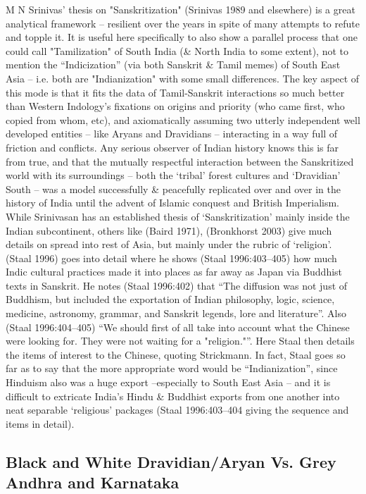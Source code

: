 M N Srinivas’ thesis on "Sanskritization" (Srinivas 1989 and elsewhere) is a great analytical framework – resilient over the years in spite of many attempts to refute and topple it. It is useful here specifically to also show a parallel process that one could call "Tamilization" of South India (\& North India to some extent), not to mention the “Indicization” (via both Sanskrit \& Tamil memes) of South East Asia -- i.e. both are "Indianization" with some small differences. The key aspect of this mode is that it fits the data of Tamil-Sanskrit interactions so much better than Western Indology’s fixations on origins and priority (who came first, who copied from whom, etc), and axiomatically assuming two utterly independent well developed entities – like Aryans and Dravidians – interacting in a way full of friction and conflicts. Any serious observer of Indian history knows this is far from true, and that the mutually respectful interaction between the Sanskritized world with its surroundings – both the ‘tribal’ forest cultures and ‘Dravidian’ South – was a model successfully \& peacefully replicated over and over in the history of India until the advent of Islamic conquest and British Imperialism. While Srinivasan has an established thesis of ‘Sanskritization’ mainly inside the Indian subcontinent, others like (Baird 1971), (Bronkhorst 2003) give much details on spread into rest of Asia, but mainly under the rubric of ‘religion’. (Staal 1996) goes into detail where he shows (Staal 1996:403–405) how much Indic cultural practices made it into places as far away as Japan via Buddhist texts in Sanskrit. He notes (Staal 1996:402) that “The diffusion was not just of Buddhism, but included the exportation of Indian philosophy, logic, science, medicine, astronomy, grammar, and Sanskrit legends, lore and literature”. Also (Staal 1996:404–405) “We should first of all take into account what the Chinese were looking for. They were not waiting for a "religion."”. Here Staal then details the items of interest to the Chinese, quoting Strickmann. In fact, Staal goes so far as to say that the more appropriate word would be “Indianization”, since Hinduism also was a huge export –especially to South East Asia – and it is difficult to extricate India’s Hindu \& Buddhist exports from one another into neat separable ‘religious’ packages (Staal 1996:403–404 giving the sequence and items in detail).


\subsection*{Black and White Dravidian/Aryan Vs. Grey Andhra and Karnataka}

